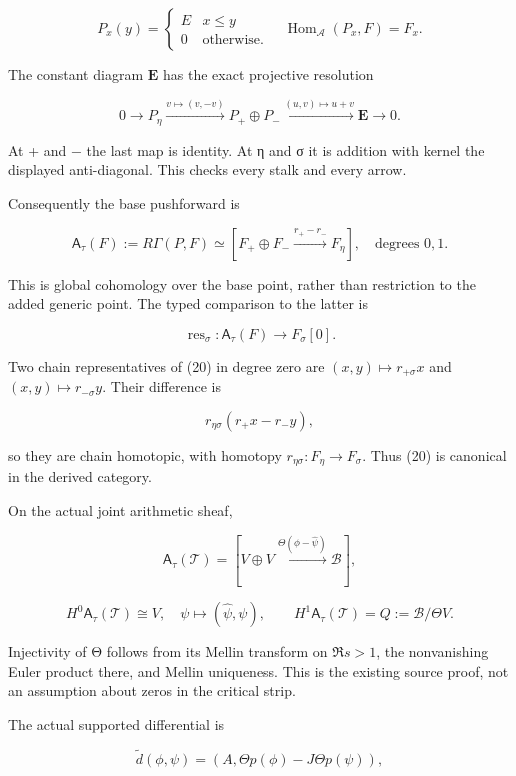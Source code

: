 \documentclass{article}
\begin{document}
\[
P_x(y)=\begin{cases}E&x\le y\\0&\text{otherwise}.\end{cases}
\quad
\operatorname{Hom}_{\mathcal A}(P_x,F)=F_x.
\tag{17}
\]

The constant diagram \(\mathbf E\) has the exact projective resolution

\[
0\longrightarrow P_\eta
\xrightarrow{v\mapsto(v,-v)}P_+\oplus P_-
\xrightarrow{(u,v)\mapsto u+v}\mathbf E\longrightarrow0.
\tag{18}
\]

At + and − the last map is identity. At η and σ it is addition with kernel the displayed anti-diagonal. This checks every stalk and every arrow.

Consequently the base pushforward is

\[
\mathsf A_\tau(F):=R\Gamma(P,F)
\simeq[F_+\oplus F_-\xrightarrow{r_+-r_-}F_\eta],
\quad\text{degrees }0,1.
\tag{19}
\]

This is global cohomology over the base point, rather than restriction to the added generic point. The typed comparison to the latter is

\[
\operatorname{res}_\sigma:\mathsf A_\tau(F)\longrightarrow F_\sigma[0].
\tag{20}
\]

Two chain representatives of (20) in degree zero are \((x,y)\mapsto r_{+\sigma}x\) and \((x,y)\mapsto r_{-\sigma}y\). Their difference is

\[
r_{\eta\sigma}(r_+x-r_-y),
\]

so they are chain homotopic, with homotopy \(r_{\eta\sigma}:F_\eta\to F_\sigma\). Thus (20) is canonical in the derived category.

On the actual joint arithmetic sheaf,

\[
\mathsf A_\tau(\mathcal T)
=[V\oplus V\xrightarrow{\Theta(\phi-\widehat\psi)}\mathscr B],
\tag{21}
\]

\[
H^0\mathsf A_\tau(\mathcal T)\cong V,
\quad \psi\mapsto(\widehat\psi,\psi),
\qquad
H^1\mathsf A_\tau(\mathcal T)=Q:=\mathscr B/\Theta V.
\tag{22}
\]

Injectivity of Θ follows from its Mellin transform on \(\Re s>1\), the nonvanishing Euler product there, and Mellin uniqueness. This is the existing source proof, not an assumption about zeros in the critical strip.

The actual supported differential is

\[
\widetilde d(\phi,\psi)
=(A,\Theta p(\phi)-J\Theta p(\psi)),
\tag{23}
\]
\end{document}
